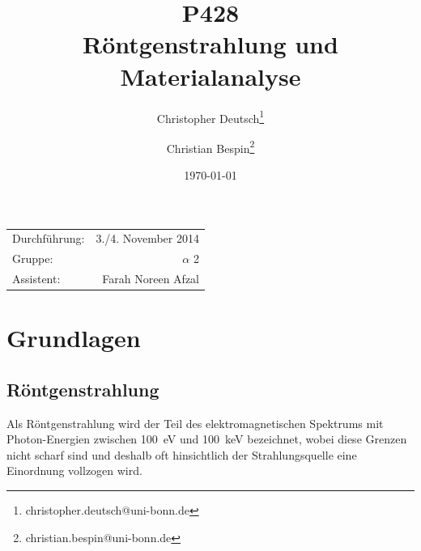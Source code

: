 \documentclass[10pt, a4paper]{article}
\title{P428 \\ Röntgenstrahlung und Materialanalyse}
\author{Christopher Deutsch\footnote{christopher.deutsch@uni-bonn.de} \and Christian Bespin\footnote{christian.bespin@uni-bonn.de}}
\date{\today}
\begin{document}
\maketitle

\begin{center}
\begin{tabular}{l r}
Durchführung: & 3./4. November 2014 \\
Gruppe: & $\alpha$ 2 \\
Assistent: & Farah Noreen Afzal
\end{tabular}
\end{center}

\begin{abstract}
\noindent
\end{abstract}

\tableofcontents
\newpage


\section{Grundlagen}
\subsection{Röntgenstrahlung}
Als Röntgenstrahlung wird der Teil des elektromagnetischen Spektrums mit Photon-Energien zwischen \SI{100}{\electronvolt} und \SI{100}{\kilo\electronvolt} bezeichnet, wobei diese Grenzen nicht scharf sind und deshalb oft hinsichtlich der Strahlungsquelle eine Einordnung vollzogen wird.
\end{document}
